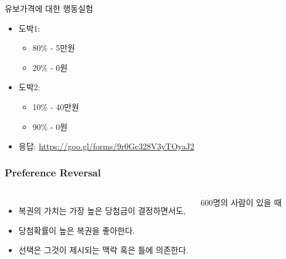 \documentclass[final]{beamer}
\begin{document}
\begin{frame}[t]{유보가격에 대한 행동실험}
	\begin{itemize}
		\item 도박1: 
		\begin{itemize}
			\item 80\% - 5만원
			\item 20\% - 0원
		\end{itemize}
		\item 도박2:
		\begin{itemize}
			\item 10\% - 40만원
			\item 90\% - 0원
		\end{itemize}
		\item 응답: \url{https://goo.gl/forms/9r0Gc328V3yTOyaJ2}
	\end{itemize}
\end{frame}

%
\begin{frame}\frametitle{Preference Reversal}\vspace{3em}
%
\begin{columns}[c]
\column{12em}
\begin{itemize}
\item 복권의 가치는 가장 높은 당첨금이 결정하면서도, 
\item 당첨확률이 높은 복권을 좋아한다. 
\item 선택은 그것이 제시되는 맥락 혹은 틀에 의존한다. 
\end{itemize}
\column{18em}
600명의 사람이 있을 때 \\[1em]
\\[1em]
\end{columns}
\end{frame}
%
\end{document}
